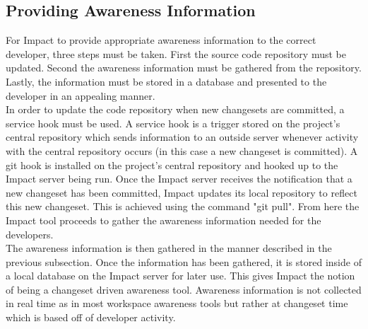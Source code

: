 \documentclass[conference]{IEEEtran}
\begin{document}
\subsection{Providing Awareness Information}
For Impact to provide appropriate awareness information to the correct developer, three steps must be taken.
First the source code repository must be updated. Second the awareness information must be gathered from 
the repository. Lastly, the information must be stored in a database and presented to the developer in an 
appealing manner. \\

In order to update the code repository when new changesets are committed, a service hook must be used.
A service hook is a trigger stored on the project's central repository which sends information to an outside
server whenever activity with the central repository occurs (in this case a new changeset is committed). A git hook is installed
on the project's central repository and hooked up to the Impact server being run. Once the Impact server 
receives the notification that a new changeset has been committed, Impact updates its local repository to
reflect this new changeset. This is achieved using the command "git pull". From here the Impact tool proceeds to gather the awareness information needed
for the developers. \\

The awareness information is then gathered in the manner described in the previous subsection. Once the 
information has been gathered, it is stored inside of a local database on the Impact server for later use.
This gives Impact the notion of being a changeset driven awareness tool. Awareness information is not
collected in real time as in most workspace awareness tools but rather at changeset time which is based
off of developer activity.\\
\end{document}
